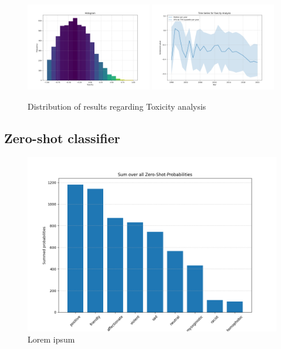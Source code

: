 \begin{figure}[!htb]
    \centering
    \includegraphics[width=0.49\textwidth]{figures/toxicity_histogram.png}
    \includegraphics[width=0.49\textwidth]{figures/time_series_toxicity.png}
    \caption{Distribution of results regarding Toxicity analysis}
    \label{fig:toxicity}
\end{figure}




\subsection*{Zero-shot classifier}


\begin{figure}[!htb]
    \centering
    \includegraphics[width=\textwidth]{figures/overall_score_zero_shot.png}
    \caption[]{Lorem ipsum}
\end{figure}

